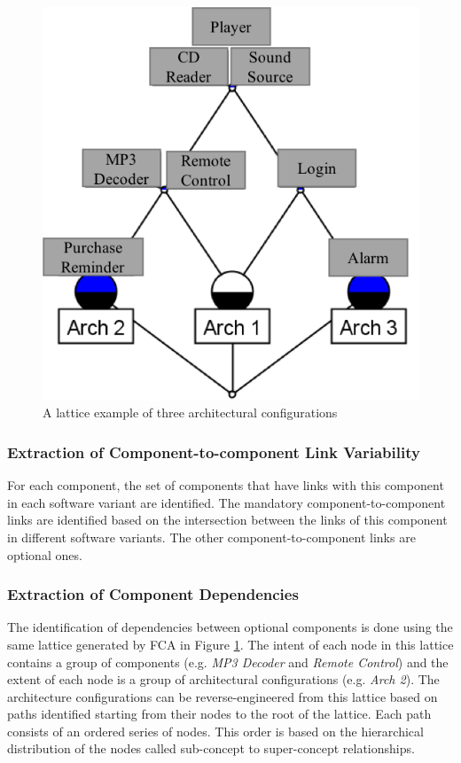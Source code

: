 \documentclass[graybox]{svmult}
\begin{document}
\begin{figure}[h]
\centering
\includegraphics[scale=0.75]{figs/FCA_Arhc_Exam.png}
\caption{A lattice example of three architectural configurations}
\label{fig:lattArchExam}
\end{figure}


\subsubsection{Extraction of Component-to-component Link Variability}
For each component, the set of components that have links with this component in each software variant are identified. The mandatory component-to-component links are identified based on the intersection between the links of this component in different software variants. The other component-to-component links are optional ones.


\subsubsection{Extraction of Component Dependencies}
The identification of dependencies between optional components is done using the same lattice generated by FCA in Figure \ref{fig:lattArchExam}. The intent of each node in this lattice contains a group of components (e.g. \textit{MP3 Decoder} and \textit{Remote Control}) and the extent  of each node is a group of architectural configurations (e.g. \textit{Arch 2}).
The architecture configurations can be reverse-engineered from this lattice based on paths identified starting from their nodes to the root of the lattice. Each path consists of an ordered series of nodes. This order is based on the hierarchical distribution of the nodes called sub-concept to super-concept relationships.
\end{document}
